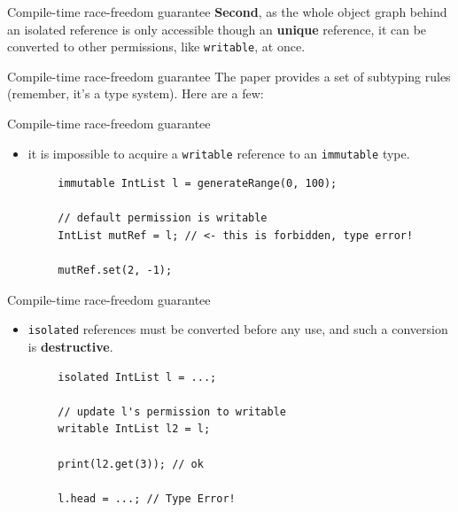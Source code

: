 \documentclass[handout]{beamer} %
\begin{document}

\begin{frame}[fragile]{Compile-time race-freedom guarantee}
	\textbf{Second}, as the whole object graph behind an isolated reference
	is only accessible though an \textbf{unique} reference, it can be
	converted to other permissions, like \texttt{writable}, at once.
	\vfill
	\begin{center}
	\end{center}
\end{frame}


\begin{frame}{Compile-time race-freedom guarantee}
	The paper provides a set of subtyping rules (remember, it's a type
	system). Here are a few:
\end{frame}

\begin{frame}[fragile]{Compile-time race-freedom guarantee}
	\begin{itemize}
	\item it is impossible to acquire a \texttt{writable} reference to
	      an \texttt{immutable} type.
	\end{itemize}
	\begin{lstlisting}
		immutable IntList l = generateRange(0, 100);
		
		// default permission is writable
		IntList mutRef = l; // <- this is forbidden, type error!
		
		mutRef.set(2, -1);
	\end{lstlisting}
\end{frame}

\begin{frame}[fragile]{Compile-time race-freedom guarantee}
	\begin{itemize}
	\item \texttt{isolated} references must be converted before any use,
	      and such a conversion is \textbf{destructive}.
	\end{itemize}
	\begin{lstlisting}
		isolated IntList l = ...;
		
		// update l's permission to writable
		writable IntList l2 = l;
		
		print(l2.get(3)); // ok
		
		l.head = ...; // Type Error!
	\end{lstlisting}
\end{frame}
\end{document}
